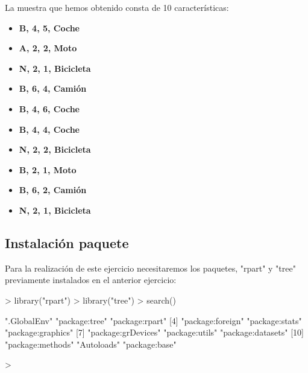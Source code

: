\documentclass[a4paper]{article}
\begin{document}
La muestra que hemos obtenido consta de 10 características:
\begin{itemize}
	\item \textbf{{B, 4, 5, Coche}}
	\item \textbf{{A, 2, 2, Moto}}
	\item \textbf{{N, 2, 1, Bicicleta}}
        \item \textbf{{B, 6, 4, Camión}}
        \item \textbf{{B, 4, 6, Coche}}
        \item \textbf{{B, 4, 4, Coche}}
        \item \textbf{{N, 2, 2, Bicicleta}}
        \item \textbf{{B, 2, 1, Moto}}
        \item \textbf{{B, 6, 2, Camión}}
        \item \textbf{{N, 2, 1, Bicicleta}}

\end{itemize}

\subsection{Instalación paquete}
Para la realización de este ejercicio necesitaremos los paquetes, "rpart" y "tree" previamente instalados en el anterior ejercicio:

\begin{Schunk}
\begin{Sinput}
> library("rpart")
> library("tree")
> search()
\end{Sinput}
\begin{Soutput}
 [1] ".GlobalEnv"        "package:tree"      "package:rpart"    
 [4] "package:foreign"   "package:stats"     "package:graphics" 
 [7] "package:grDevices" "package:utils"     "package:datasets" 
[10] "package:methods"   "Autoloads"         "package:base"     
\end{Soutput}
\begin{Sinput}
> 
\end{Sinput}
\end{Schunk}
\end{document}

